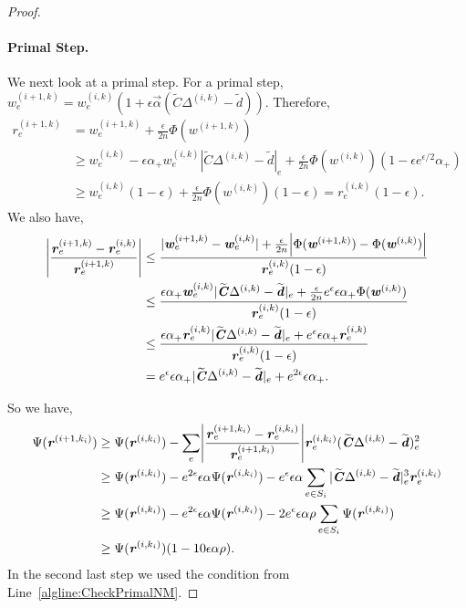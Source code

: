 \documentclass[11pt]{article}
\def\abs#1{\left| #1 \right|}
\let\originalleft\left
\let\originalright\right
\renewcommand{\left}{\mathopen{}\mathclose\bgroup\originalleft}
\renewcommand{\right}{\aftergroup\egroup\originalright}
\newcommand\dd{\boldsymbol{\mathit{d}}}
\newcommand\rr{\boldsymbol{\mathit{r}}}
\newcommand\ww{\boldsymbol{\mathit{w}}}
\newcommand\CC{\boldsymbol{\mathit{C}}}
\newcommand{\wt}{\widetilde}
\begin{document}
\begin{proof}
\paragraph{Primal Step.}
\noindent We next look at a primal step. For a primal step, $\ww_e^{(i+1,k)} = \ww_e^{(i,k)}(1+\epsilon\overrightarrow{\alpha} (\wt{\CC} \Delta^{(i,k)} - \wt{\dd}))$. 
Therefore,
\begin{align*}
\rr_e^{(i+1,k)} & = \ww_e^{(i+1,k)} + \frac{\epsilon}{2n}\Phi(\ww^{(i+1,k)}) \\
&\geq \ww_e^{(i,k)} -  \epsilon\alpha_+ \ww^{(i,k)}_e |\wt{\CC} \Delta^{(i,k)} - \wt{\dd}|_e + \frac{\epsilon}{2n} \Phi(\ww^{(i,k)}) (1-\epsilon e^{\epsilon/2} \alpha_+)\\
& \geq \ww^{(i,k)}_e (1-\epsilon) + \frac{\epsilon}{2n} \Phi(\ww^{(i,k)}) (1-\epsilon) = \rr^{(i,k)}_e (1-\epsilon).
\end{align*}
We also have,
\begin{align*}
    \abs{\frac{\rr_e^{(i+1,k)}-\rr_e^{(i,k)}}{\rr_e^{(i+1,k)}}} & \leq \frac{|\ww_e^{(i+1,k)}-\ww_e^{(i,k)}| + \frac{\epsilon}{2n}\abs{\Phi(\ww^{(i+1,k)})-\Phi(\ww^{(i,k)})}}{\rr_e^{(i,k)} (1-\epsilon)}\\
    & \leq \frac{\epsilon \alpha_+ \ww_e^{(i,k)}|\wt{\CC} \Delta^{(i,k)} - \wt{\dd}|_e + \frac{\epsilon}{2n}e^{\epsilon}\epsilon\alpha_+\Phi(\ww^{(i,k)})}{\rr^{(i,k)}_e (1-\epsilon)}\\
    & \leq \frac{\epsilon \alpha_+ \rr^{(i,k)}_e|\wt{\CC} \Delta^{(i,k)} - \wt{\dd}|_e + e^{\epsilon}\epsilon\alpha_+\rr^{(i,k)}_e}{\rr^{(i,k)}_e (1-\epsilon)}\\
    & = e^{\epsilon}\epsilon\alpha_+ |\wt{\CC} \Delta^{(i,k)} - \wt{\dd}|_e + e^{2\epsilon}\epsilon\alpha_+. 
\end{align*}


So we have,
\begin{align*}
\Psi(\rr^{(i+1,k_i)}) & \geq \Psi(\rr^{(i,k_i)}) - \sum_e \abs{\frac{\rr_e^{(i+1,k_i)}-\rr^{(i,k_i)}_e}{\rr_e^{(i+1,k_i)}}}\rr^{(i,k_i)}_e (\wt{\CC} \Delta^{(i,k)} - \wt{\dd})_e^2\\
& \geq \Psi(\rr^{(i,k_i)}) - e^{2\epsilon}\epsilon \alpha \Psi(\rr^{(i,k_i)}) - e^{\epsilon}\epsilon\alpha \sum_{e\in S_i}  |\wt{\CC} \Delta^{(i,k)} - \wt{\dd}|^3_e \rr^{(i,k_i)}_e \\
& \geq \Psi(\rr^{(i,k_i)}) - e^{2\epsilon}\epsilon \alpha \Psi(\rr^{(i,k_i)}) - 2e^{\epsilon}\epsilon\alpha \rho\sum_{e\in S_i}  \Psi(\rr^{(i,k_i)})\\
& \geq \Psi(\rr^{(i,k_i)})\left(1 -10\epsilon\alpha \rho \right).
\end{align*}
In the second last step we used the condition from Line~\ref{algline:CheckPrimalNM}.
\end{proof}
\end{document}

